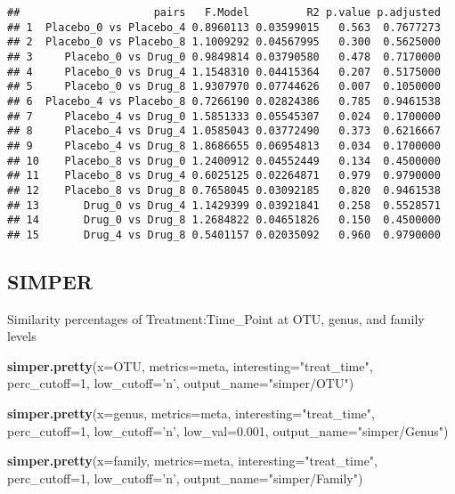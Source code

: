 \documentclass[]{article}
\newenvironment{Shaded}{\begin{snugshade}}{\end{snugshade}}
\newcommand{\KeywordTok}[1]{\textcolor[rgb]{0.13,0.29,0.53}{\textbf{#1}}}
\newcommand{\DataTypeTok}[1]{\textcolor[rgb]{0.13,0.29,0.53}{#1}}
\newcommand{\DecValTok}[1]{\textcolor[rgb]{0.00,0.00,0.81}{#1}}
\newcommand{\FloatTok}[1]{\textcolor[rgb]{0.00,0.00,0.81}{#1}}
\newcommand{\StringTok}[1]{\textcolor[rgb]{0.31,0.60,0.02}{#1}}
\newcommand{\NormalTok}[1]{#1}
\begin{document}
\begin{verbatim}
##                     pairs   F.Model         R2 p.value p.adjusted
## 1  Placebo_0 vs Placebo_4 0.8960113 0.03599015   0.563  0.7677273
## 2  Placebo_0 vs Placebo_8 1.1009292 0.04567995   0.300  0.5625000
## 3     Placebo_0 vs Drug_0 0.9849814 0.03790580   0.478  0.7170000
## 4     Placebo_0 vs Drug_4 1.1548310 0.04415364   0.207  0.5175000
## 5     Placebo_0 vs Drug_8 1.9307970 0.07744626   0.007  0.1050000
## 6  Placebo_4 vs Placebo_8 0.7266190 0.02824386   0.785  0.9461538
## 7     Placebo_4 vs Drug_0 1.5851333 0.05545307   0.024  0.1700000
## 8     Placebo_4 vs Drug_4 1.0585043 0.03772490   0.373  0.6216667
## 9     Placebo_4 vs Drug_8 1.8686655 0.06954813   0.034  0.1700000
## 10    Placebo_8 vs Drug_0 1.2400912 0.04552449   0.134  0.4500000
## 11    Placebo_8 vs Drug_4 0.6025125 0.02264871   0.979  0.9790000
## 12    Placebo_8 vs Drug_8 0.7658045 0.03092185   0.820  0.9461538
## 13       Drug_0 vs Drug_4 1.1429399 0.03921841   0.258  0.5528571
## 14       Drug_0 vs Drug_8 1.2684822 0.04651826   0.150  0.4500000
## 15       Drug_4 vs Drug_8 0.5401157 0.02035092   0.960  0.9790000
\end{verbatim}

\subsection{SIMPER}\label{simper}

Similarity percentages of Treatment:Time\_Point at OTU, genus, and
family levels

\begin{Shaded}
\begin{Highlighting}[]
\KeywordTok{simper.pretty}\NormalTok{(}\DataTypeTok{x=}\NormalTok{OTU, }\DataTypeTok{metrics=}\NormalTok{meta, }\DataTypeTok{interesting=}\StringTok{"treat_time"}\NormalTok{, }\DataTypeTok{perc_cutoff=}\DecValTok{1}\NormalTok{, }\DataTypeTok{low_cutoff=}\StringTok{'n'}\NormalTok{, }\DataTypeTok{output_name=}\StringTok{"simper/OTU"}\NormalTok{)}

\KeywordTok{simper.pretty}\NormalTok{(}\DataTypeTok{x=}\NormalTok{genus, }\DataTypeTok{metrics=}\NormalTok{meta, }\DataTypeTok{interesting=}\StringTok{"treat_time"}\NormalTok{, }\DataTypeTok{perc_cutoff=}\DecValTok{1}\NormalTok{, }\DataTypeTok{low_cutoff=}\StringTok{'n'}\NormalTok{, }\DataTypeTok{low_val=}\FloatTok{0.001}\NormalTok{, }\DataTypeTok{output_name=}\StringTok{"simper/Genus"}\NormalTok{)}

\KeywordTok{simper.pretty}\NormalTok{(}\DataTypeTok{x=}\NormalTok{family, }\DataTypeTok{metrics=}\NormalTok{meta, }\DataTypeTok{interesting=}\StringTok{"treat_time"}\NormalTok{, }\DataTypeTok{perc_cutoff=}\DecValTok{1}\NormalTok{, }\DataTypeTok{low_cutoff=}\StringTok{'n'}\NormalTok{, }\DataTypeTok{output_name=}\StringTok{"simper/Family"}\NormalTok{)}
\end{Highlighting}
\end{Shaded}
\end{document}
